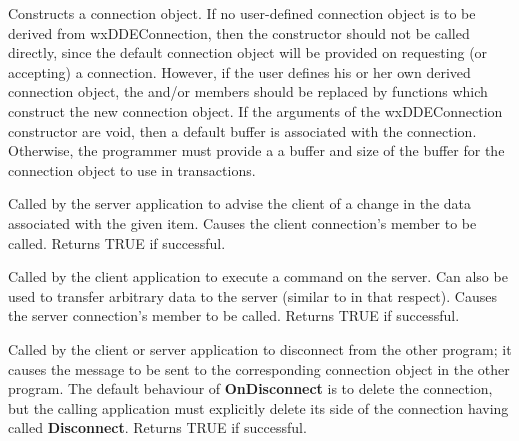 



Constructs a connection object. If no user-defined connection object is
to be derived from wxDDEConnection, then the constructor should not be
called directly, since the default connection object will be provided on
requesting (or accepting) a connection. However, if the user defines his
or her own derived connection object, the \rtfsp
and/or  members should be replaced by
functions which construct the new connection object. If the arguments of
the wxDDEConnection constructor are void, then a default buffer is
associated with the connection. Otherwise, the programmer must provide a
a buffer and size of the buffer for the connection object to use in
transactions.



Called by the server application to advise the client of a change in
the data associated with the given item. Causes the client
connection's 
member to be called. Returns TRUE if successful.



Called by the client application to execute a command on the server. Can
also be used to transfer arbitrary data to the server (similar
to  in that respect). Causes the
server connection's  member to be
called. Returns TRUE if successful.



Called by the client or server application to disconnect from the other
program; it causes the  message
to be sent to the corresponding connection object in the other
program. The default behaviour of {\bf OnDisconnect} is to delete the
connection, but the calling application must explicitly delete its
side of the connection having called {\bf Disconnect}. Returns TRUE if
successful.

